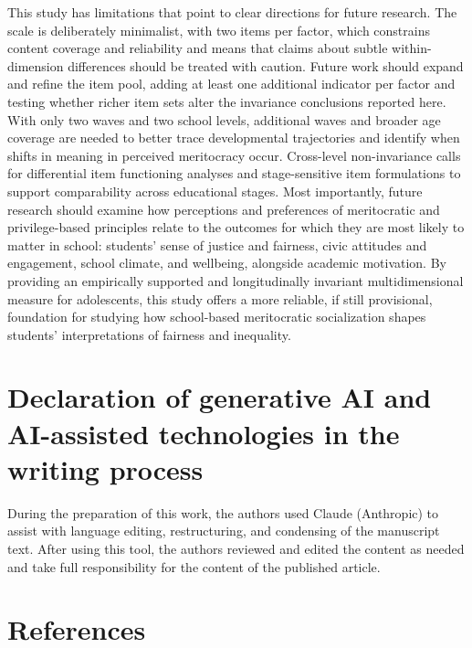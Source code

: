 \documentclass[
  13pt,
]{article}
\begin{document}
This study has limitations that point to clear directions for future
research. The scale is deliberately minimalist, with two items per
factor, which constrains content coverage and reliability and means that
claims about subtle within-dimension differences should be treated with
caution. Future work should expand and refine the item pool, adding at
least one additional indicator per factor and testing whether richer
item sets alter the invariance conclusions reported here. With only two
waves and two school levels, additional waves and broader age coverage
are needed to better trace developmental trajectories and identify when
shifts in meaning in perceived meritocracy occur. Cross-level
non-invariance calls for differential item functioning analyses and
stage-sensitive item formulations to support comparability across
educational stages. Most importantly, future research should examine how
perceptions and preferences of meritocratic and privilege-based
principles relate to the outcomes for which they are most likely to
matter in school: students' sense of justice and fairness, civic
attitudes and engagement, school climate, and wellbeing, alongside
academic motivation. By providing an empirically supported and
longitudinally invariant multidimensional measure for adolescents, this
study offers a more reliable, if still provisional, foundation for
studying how school-based meritocratic socialization shapes students'
interpretations of fairness and inequality.

\section{Declaration of generative AI and AI-assisted technologies in
the writing
process}\label{declaration-of-generative-ai-and-ai-assisted-technologies-in-the-writing-process}

During the preparation of this work, the authors used Claude (Anthropic)
to assist with language editing, restructuring, and condensing of the
manuscript text. After using this tool, the authors reviewed and edited
the content as needed and take full responsibility for the content of
the published article.

\section{References}\label{references}
\end{document}
